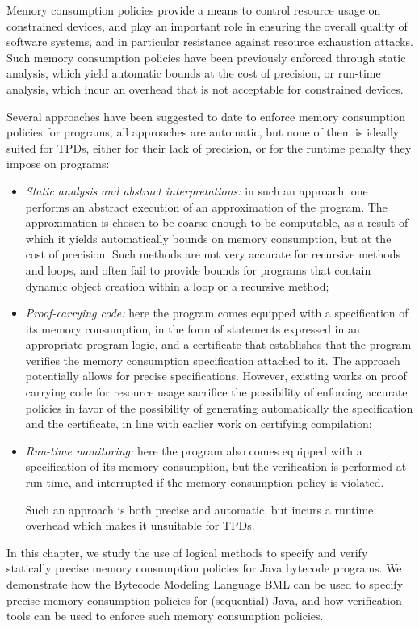 
Memory consumption policies provide a means to control
resource usage on constrained devices, and play an important role
in ensuring the overall quality of software systems, and in
particular resistance against resource exhaustion attacks. Such
memory consumption policies have been previously enforced through
static analysis, which yield automatic bounds at the
cost of precision, or run-time analysis, which incur an overhead
that is not acceptable for constrained devices.

Several approaches have been suggested to date to enforce memory
consumption policies for programs; all approaches are automatic,
but none of them is ideally suited for TPDs, either for their
lack of precision, or for the runtime penalty they impose on
programs:
\begin{itemize}
\item \emph{Static analysis and abstract interpretations:} in such an
approach, one performs an abstract execution of an approximation of
the program. The approximation is chosen to be coarse enough to be
computable, as a result of which it yields automatically bounds on
memory consumption, but at the cost of precision. Such methods are not
very accurate for recursive methods and loops, and often fail to
provide bounds for programs that contain dynamic object creation
within a loop or a recursive method;


\item \emph{Proof-carrying code:} here the program
comes equipped with a specification of its memory consumption, in the
form of statements expressed in an appropriate program logic, and a
certificate that establishes that the program verifies the memory
consumption specification attached to it. The approach potentially
allows for precise specifications. However, existing works on proof
carrying code for resource usage sacrifice the possibility of
enforcing accurate policies in favor of the possibility of generating
automatically the specification and the certificate, in line with
earlier work on certifying compilation;

\item \emph{Run-time monitoring:} here the program also comes equipped
with a specification of its memory consumption, but the verification
is performed at run-time, and interrupted if the memory consumption
policy is violated.
 


Such an approach is both precise and automatic, but incurs a runtime
overhead which makes it unsuitable for TPDs.
\end{itemize}
In this chapter, we study the use of logical methods to specify and
verify statically precise memory consumption policies for Java
bytecode programs. We demonstrate how the Bytecode Modeling
Language BML  can be used to specify precise memory consumption policies
for (sequential) Java, and how verification tools can
be used to enforce such memory consumption policies. 


